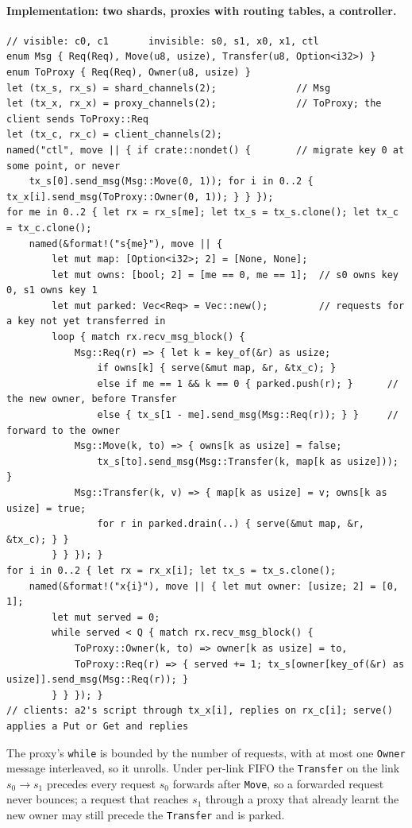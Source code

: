 \documentclass[11pt,a4paper]{article}
\newcommand{\code}[1]{\texttt{#1}}
\begin{document}
\paragraph{Implementation: two shards, proxies with routing tables, a controller.}
\begin{lstlisting}
// visible: c0, c1       invisible: s0, s1, x0, x1, ctl
enum Msg { Req(Req), Move(u8, usize), Transfer(u8, Option<i32>) }
enum ToProxy { Req(Req), Owner(u8, usize) }
let (tx_s, rx_s) = shard_channels(2);              // Msg
let (tx_x, rx_x) = proxy_channels(2);              // ToProxy; the client sends ToProxy::Req
let (tx_c, rx_c) = client_channels(2);
named("ctl", move || { if crate::nondet() {        // migrate key 0 at some point, or never
    tx_s[0].send_msg(Msg::Move(0, 1)); for i in 0..2 { tx_x[i].send_msg(ToProxy::Owner(0, 1)); } } });
for me in 0..2 { let rx = rx_s[me]; let tx_s = tx_s.clone(); let tx_c = tx_c.clone();
    named(&format!("s{me}"), move || {
        let mut map: [Option<i32>; 2] = [None, None];
        let mut owns: [bool; 2] = [me == 0, me == 1];  // s0 owns key 0, s1 owns key 1
        let mut parked: Vec<Req> = Vec::new();         // requests for a key not yet transferred in
        loop { match rx.recv_msg_block() {
            Msg::Req(r) => { let k = key_of(&r) as usize;
                if owns[k] { serve(&mut map, &r, &tx_c); }
                else if me == 1 && k == 0 { parked.push(r); }      // the new owner, before Transfer
                else { tx_s[1 - me].send_msg(Msg::Req(r)); } }     // forward to the owner
            Msg::Move(k, to) => { owns[k as usize] = false;
                tx_s[to].send_msg(Msg::Transfer(k, map[k as usize])); }
            Msg::Transfer(k, v) => { map[k as usize] = v; owns[k as usize] = true;
                for r in parked.drain(..) { serve(&mut map, &r, &tx_c); } }
        } } }); }
for i in 0..2 { let rx = rx_x[i]; let tx_s = tx_s.clone();
    named(&format!("x{i}"), move || { let mut owner: [usize; 2] = [0, 1];
        let mut served = 0;
        while served < Q { match rx.recv_msg_block() {
            ToProxy::Owner(k, to) => owner[k as usize] = to,
            ToProxy::Req(r) => { served += 1; tx_s[owner[key_of(&r) as usize]].send_msg(Msg::Req(r)); }
        } } }); }
// clients: a2's script through tx_x[i], replies on rx_c[i]; serve() applies a Put or Get and replies
\end{lstlisting}
The proxy's \code{while} is bounded by the number of requests, with at most one \code{Owner}
message interleaved, so it unrolls. Under per-link FIFO the \code{Transfer} on the link
$s_0 \to s_1$ precedes every request $s_0$ forwards after \code{Move}, so a forwarded request
never bounces; a request that reaches $s_1$ through a proxy that already learnt the new owner
may still precede the \code{Transfer} and is parked.
\end{document}
